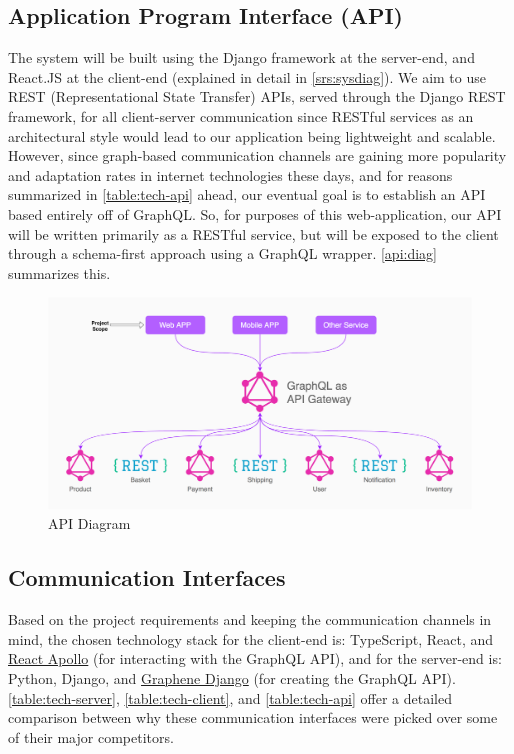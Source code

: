 \subsection{Application Program Interface (API)}
The system will be built using the Django framework at the server-end, and React.JS at the client-end (explained in detail in \autoref{srs:sysdiag}). We aim to use REST (Representational State Transfer) APIs, served through the Django REST framework, for all client-server communication since RESTful services as an architectural style would lead to our application being lightweight and scalable. However, since graph-based communication channels are gaining more popularity and adaptation rates in internet technologies these days, and for reasons summarized in \autoref{table:tech-api} ahead, our eventual goal is to establish an API based entirely off of GraphQL. So, for purposes of this web-application, our API will be written primarily as a RESTful service, but will be exposed to the client through a schema-first approach using a GraphQL wrapper. \autoref{api:diag} summarizes this.
\begin{figure}[H]
\includegraphics[width=15cm]{images/APIDiagram.pdf} 
\centering
\caption{API Diagram}
\label{api:diag}
\end{figure}

\subsection{Communication Interfaces}
Based on the project requirements and keeping the communication channels in mind, the chosen technology stack for the client-end is: TypeScript, React, and \href{https://github.com/apollographql/react-apollo}{React Apollo} (for interacting with the GraphQL API), and for the server-end is: Python, Django, and \href{https://github.com/graphql-python/graphene-django}{Graphene Django} (for creating the GraphQL API). \autoref{table:tech-server}, \autoref{table:tech-client}, and \autoref{table:tech-api} offer a detailed comparison between why these communication interfaces were picked over some of their major competitors.


